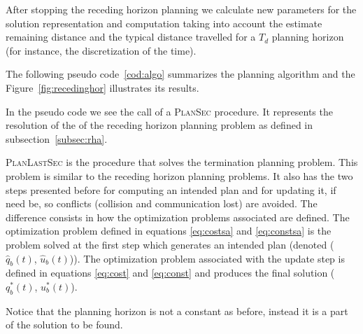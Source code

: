 \documentclass[eprint]{actapoly}
\begin{document}
After stopping the receding horizon planning we calculate new parameters for the 
solution representation and computation taking into
account the estimate remaining distance and the typical distance travelled
for a $T_d$ planning horizon (for instance, the discretization of the time).

The following pseudo code~\ref{cod:algo} summarizes the planning algorithm
and the Figure~\ref{fig:recedinghor} illustrates its results.

In the pseudo code we see the call of a {\scshape PlanSec} procedure.
It represents the resolution of the of the receding horizon planning problem
as defined in subsection~\ref{subsec:rha}.

{\scshape PlanLastSec} is the procedure that solves the termination planning
problem. This problem is similar to the receding horizon planning problems.
It also has the two steps presented before for computing an intended plan and
for updating it, if need be, so conflicts (collision and communication lost)
are avoided. The difference consists in how the optimization problems associated
are defined. The optimization problem defined in equations \ref{eq:costsa} and
\ref{eq:constsa} is the problem solved at the first step which generates an
intended plan (denoted ($\hat{q}_b(t)$, $\hat{u}_b(t)$)). The optimization
problem associated with the update step is defined in equations 
\ref{eq:cost} and \ref{eq:const} and produces the final solution ($q^*_b(t)$, $u^*_b(t)$).

Notice that the planning horizon is not a constant as before,
instead it is a part of the solution to be found.
\end{document}
